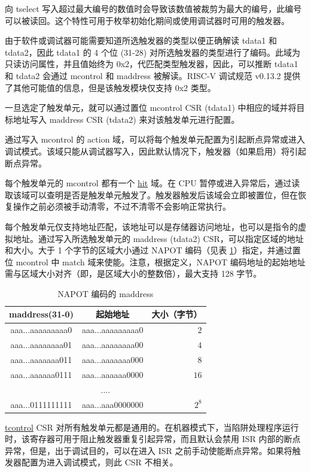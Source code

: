 \documentclass[main\_\_CN.tex]{subfiles}
\begin{document}
向 tselect 写入超过最大编号的数值时会导致该数值被裁剪为最大的编号，此编号可以被读回。这个特性可用于枚举初始化期间或使用调试器时可用的触发器。

由于软件或调试器可能需要知道所选触发器的类型以便正确解读 tdata1 和 tdata2，因此 tdata1 的 4 个位 (31-28) 对所选触发器的类型进行了编码。此域为只读访问属性，并且值始终为 0x2，代匹配类型触发器，因此，可以推断 tdata1 和 tdata2 会通过 mcontrol 和 maddress 被解读。RISC-V 调试规范 v0.13.2 提供了其他可能值的信息，但是该触发模块仅支持 0x2 类型。

一旦选定了触发单元，就可以通过置位 mcontrol CSR (tdata1) 中相应的域并将目标地址写入 maddress CSR (tdata2) 来对该触发单元进行配置。

通过写入 mcontrol 的 action 域，可以将每个触发单元配置为引起断点异常或进入调试模式。该域只能从调试器写入，因此默认情况下，触发器（如果启用）将引起断点异常。

每个触发单元的 mcontrol 都有一个 \hyperref[fielddesc:MCONTROLHIT]{hit} 域。在 CPU 暂停或进入异常后，通过读取该域可以查明是否是触发单元触发了。触发器触发后该域会立即被置位，但在恢复操作之前必须被手动清零，不过不清零不会影响正常执行。

每个触发单元仅支持地址匹配，该地址可以是存储器访问地址，也可以是指令的虚拟地址。通过写入所选触发单元的 maddress (tdata2) CSR，可以指定区域的地址和大小。大于 1 个字节的区域大小通过 NAPOT 编码（见表 \ref{tab:riscvcpu-hwt-table}）指定，并通过置位 mcontrol 中 match 域来使能。注意，根据定义，NAPOT 编码地址的起始地址需与区域大小对齐（即，是区域大小的整数倍），最大支持 128 字节。

\begin{longtable}{ | c | c | r | }
\caption{NAPOT 编码的 maddress} \label{tab:riscvcpu-hwt-table}
\\ \hline
\rowcolor{lightgray}
maddress(31-0) & 起始地址 & 大小（字节） \\ \hline
aaa...aaaaaaaaa0 & aaa...aaaaaaaaa0 & $2$ \\ \hline
aaa...aaaaaaaa01 & aaa...aaaaaaaa00 & $4$ \\ \hline
aaa...aaaaaaa011 & aaa...aaaaaaa000 & $8$ \\ \hline
aaa...aaaaaa0111 & aaa...aaaaaa0000 & $16$ \\ \hline
\multicolumn{3}{c}{....} \\ \hline
aaa...0111111111 & aaa...aaa0000000 & $2^{8}$ \\ \hline
\end{longtable}

\hyperref[regdesc:TCONTROL]{tcontrol} CSR 对所有触发单元都是通用的。在机器模式下，当陷阱处理程序运行时，该寄存器可用于阻止触发器重复引起异常，而且默认会禁用 ISR 内部的断点异常，但是，出于调试目的，可以在进入 ISR 之前手动使能断点异常。如果将触发器配置为进入调试模式，则此 CSR 不相关。
\end{document}

